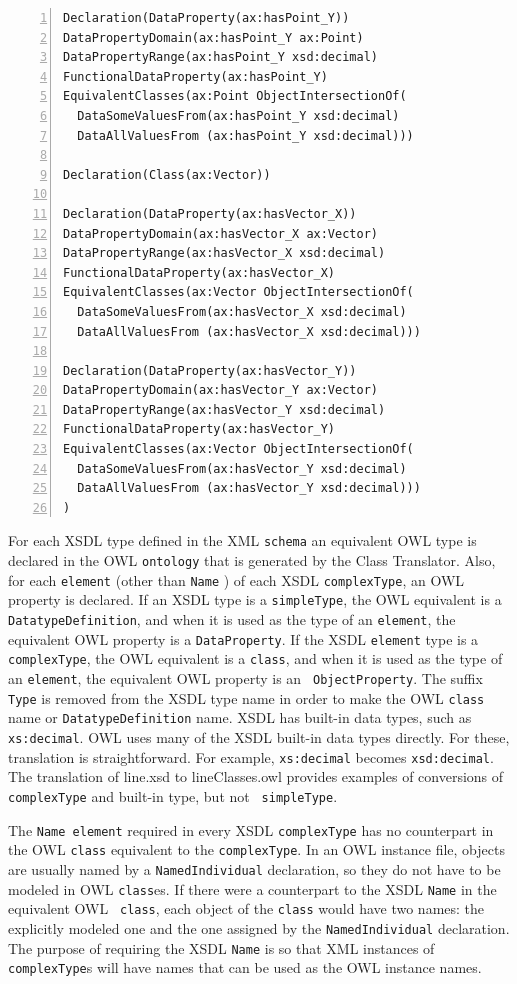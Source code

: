 \documentclass[preprint,12pt]{elsarticle}
\newenvironment{mylisting}
{\begin{list}{}{\setlength{\leftmargin}{1em}}\item\small}
{\end{list}}
\begin{document}
\begin{mylisting}
\begin{Verbatim}[commandchars=\\\{\},numbers=left, numbersep=1pt]
Declaration(DataProperty(ax:hasPoint_Y))
DataPropertyDomain(ax:hasPoint_Y ax:Point)
DataPropertyRange(ax:hasPoint_Y xsd:decimal)
FunctionalDataProperty(ax:hasPoint_Y)
EquivalentClasses(ax:Point ObjectIntersectionOf(
  DataSomeValuesFrom(ax:hasPoint_Y xsd:decimal)
  DataAllValuesFrom (ax:hasPoint_Y xsd:decimal)))

Declaration(Class(ax:Vector))

Declaration(DataProperty(ax:hasVector_X))
DataPropertyDomain(ax:hasVector_X ax:Vector)
DataPropertyRange(ax:hasVector_X xsd:decimal)
FunctionalDataProperty(ax:hasVector_X)
EquivalentClasses(ax:Vector ObjectIntersectionOf(
  DataSomeValuesFrom(ax:hasVector_X xsd:decimal)
  DataAllValuesFrom (ax:hasVector_X xsd:decimal)))

Declaration(DataProperty(ax:hasVector_Y))
DataPropertyDomain(ax:hasVector_Y ax:Vector)
DataPropertyRange(ax:hasVector_Y xsd:decimal)
FunctionalDataProperty(ax:hasVector_Y)
EquivalentClasses(ax:Vector ObjectIntersectionOf(
  DataSomeValuesFrom(ax:hasVector_Y xsd:decimal)
  DataAllValuesFrom (ax:hasVector_Y xsd:decimal)))
)
\end{Verbatim}
\label{test4}
\end{mylisting}

For each XSDL type defined in the XML {\tt schema} an equivalent OWL type
is declared in the OWL {\tt ontology} that is generated by the Class
Translator. Also, for each {\tt element} (other than {\tt Name} ) of each
XSDL {\tt complexType}, an OWL property is declared. If an XSDL type is a
{\tt simpleType}, the OWL equivalent is a {\tt DatatypeDefinition}, and
when it is used as the type of an {\tt element}, the equivalent OWL
property is a {\tt DataProperty}. If the XSDL {\tt element} type is a {\tt
  complexType}, the OWL equivalent is a {\tt class}, and when it is used as
the type of an {\tt element}, the equivalent OWL property is an {\tt
  ObjectProperty}. The suffix {\tt Type} is removed from the XSDL type
name in order to make the OWL {\tt class} name or {\tt DatatypeDefinition}
name. XSDL has built-in data types, such as {\tt xs:decimal}. OWL uses
many of the XSDL built-in data types directly. For these, translation is
straightforward. For example, {\tt xs:decimal} becomes {\tt xsd:decimal}.
The translation of line.xsd to lineClasses.owl provides examples of
conversions of {\tt complexType} and built-in type, but not {\tt
  simpleType}.

The {\tt Name element} required in every XSDL {\tt complexType} has no
counterpart in the OWL {\tt class} equivalent to the {\tt complexType}. In
an OWL instance file, objects are usually named by a {\tt NamedIndividual}
declaration, so they do not have to be modeled in OWL {\tt class}es. If
there were a counterpart to the XSDL {\tt Name} in the equivalent OWL {\tt
  class}, each object of the {\tt class} would have two names: the
explicitly modeled one and the one assigned by the {\tt NamedIndividual}
declaration. The purpose of requiring the XSDL {\tt Name} is so that XML
instances of {\tt complexType}s will have names that can be used as the OWL
instance names.
\end{document}
